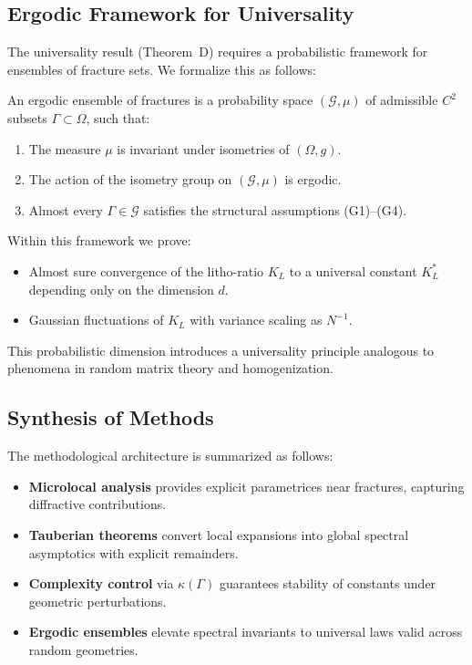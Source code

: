 \subsection{Ergodic Framework for Universality}

The universality result (Theorem~D) requires a probabilistic framework for
ensembles of fracture sets. We formalize this as follows:

\begin{definition}
An ergodic ensemble of fractures is a probability space
$(\mathcal{G},\mu)$ of admissible $C^2$ subsets $\Gamma\subset\Omega$, such
that:
\begin{enumerate}
  \item The measure $\mu$ is invariant under isometries of $(\Omega,g)$.
  \item The action of the isometry group on $(\mathcal{G},\mu)$ is ergodic.
  \item Almost every $\Gamma\in\mathcal{G}$ satisfies the structural
  assumptions (G1)--(G4).
\end{enumerate}
\end{definition}

Within this framework we prove:

\begin{itemize}
  \item Almost sure convergence of the litho-ratio $K_L$ to a universal
  constant $K_L^\ast$ depending only on the dimension $d$.
  \item Gaussian fluctuations of $K_L$ with variance scaling as $N^{-1}$.
\end{itemize}

This probabilistic dimension introduces a universality principle analogous to
phenomena in random matrix theory and homogenization.

\subsection{Synthesis of Methods}

The methodological architecture is summarized as follows:

\begin{itemize}
  \item \textbf{Microlocal analysis} provides explicit parametrices near
  fractures, capturing diffractive contributions.
  \item \textbf{Tauberian theorems} convert local expansions into global
  spectral asymptotics with explicit remainders.
  \item \textbf{Complexity control} via $\kappa(\Gamma)$ guarantees stability
  of constants under geometric perturbations.
  \item \textbf{Ergodic ensembles} elevate spectral invariants to universal
  laws valid across random geometries.
\end{itemize}

